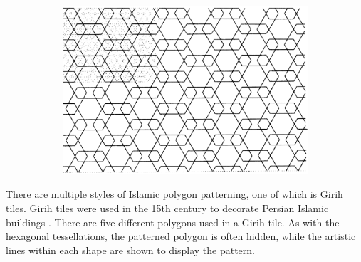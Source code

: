 \documentclass[12pt,letterpaper]{article}
\begin{document}
\begin{figure}[H]
\begin{center}
\begin{subfigure}[b]{.3\linewidth}
        \end{subfigure}
        \begin{subfigure}[b]{.3\linewidth}
            \includegraphics[width=\linewidth]{islam3}
        \end{subfigure}
    \end{center}
\end{figure}

There are multiple styles of Islamic polygon patterning, one of which is Girih tiles. Girih tiles were used in the 15th century to decorate Persian Islamic buildings \citep{girih}. There are five different polygons used in a Girih tile. As with the hexagonal tessellations, the patterned polygon is often hidden, while the artistic lines within each shape are shown to display the pattern.
\end{document}

